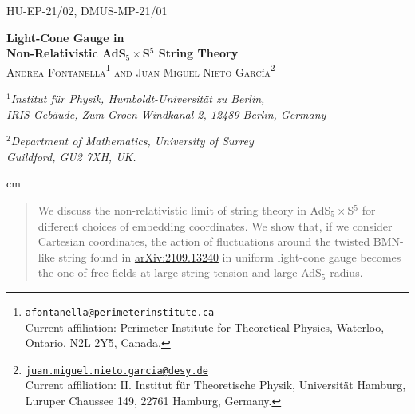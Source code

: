 \documentclass[12pt]{article}
\numberwithin{equation}{section}
\begin{document}


\begin{titlepage}
\begin{center}
\vspace*{-1.0cm}
\hfill {\footnotesize HU-EP-21/02,  DMUS-MP-21/01} 



\vspace{2.0cm} 


 
{\LARGE  {\selectfont \bf Light-Cone Gauge
in \\
\vspace{3mm}
Non-Relativistic AdS$_5\times$S$^5$ String Theory}} \\[.2cm]


\vskip 1.5cm
\textsc{Andrea Fontanella\footnote{\href{mailto:afontanella@perimeterinstitute.ca}{\texttt{afontanella@perimeterinstitute.ca}} \\
Current affiliation: Perimeter Institute for Theoretical Physics,
Waterloo, Ontario, N2L 2Y5, Canada. 
} \footnotesize
and \normalsize  Juan Miguel Nieto Garc\'ia\footnote{\href{mailto:juan.miguel.nieto.garcia@desy.de}{\texttt{juan.miguel.nieto.garcia@desy.de}} \\ Current affiliation: II. Institut für Theoretische Physik, Universität Hamburg,
Luruper Chaussee 149, 22761 Hamburg, Germany.}}
\\
\vskip 1.2cm


\begin{small}
\textit{$^1$Institut f\"ur Physik, Humboldt-Universit\"at zu Berlin, \\
IRIS Geb\"aude, Zum Gro{\beta}en Windkanal 2, 12489 Berlin, Germany}

\vspace{5mm}

\textit{$^2$Department of Mathematics,
University of Surrey \\
Guildford, GU2 7XH, UK. }
\end{small}


\end{center}





 cm
\begin{abstract}
\vskip0.5cm

\noindent We discuss the non-relativistic limit of string theory in AdS$_5\times$S$^5$ for different choices of embedding coordinates. We show that, if we consider Cartesian coordinates, the action of fluctuations around the twisted BMN-like string found in \href{https://arxiv.org/abs/2109.13240}{arXiv:2109.13240} in uniform light-cone gauge becomes the one of free fields at large string tension and large AdS$_5$ radius. 





\end{abstract}



\end{titlepage}
\end{document}

